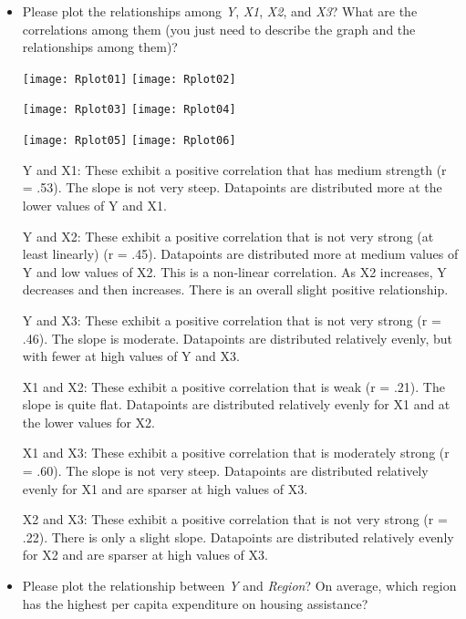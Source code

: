 \documentclass[12pt,letterpaper]{article}
\begin{document}
\begin{itemize}

\item
Please plot the relationships among \emph{Y}, \emph{X1}, \emph{X2}, and \emph{X3}? What are the correlations among them (you just need to describe the graph and the relationships among them)?
\vspace{.5cm}

\graphicspath{ {./Images/} }

\texttt{[image: Rplot01]}
\texttt{[image: Rplot02]}

\texttt{[image: Rplot03]}
\texttt{[image: Rplot04]}

\texttt{[image: Rplot05]}
\texttt{[image: Rplot06]}

  


Y and X1: These exhibit a positive correlation that has medium strength (r = .53). The slope is not very steep. Datapoints are distributed more at the lower values of Y and X1. 


Y and X2: These exhibit a positive correlation that is not very strong (at least linearly) (r = .45). Datapoints are distributed more at medium values of Y and low values of X2. This is a non-linear correlation. As X2 increases, Y decreases and then increases. There is an overall slight positive relationship. 


Y and X3: These exhibit a positive correlation that is not very strong (r = .46). The slope is moderate. Datapoints are distributed relatively evenly, but with fewer at high values of Y and X3.


X1 and X2: These exhibit a positive correlation that is weak (r = .21). The slope is quite flat. Datapoints are distributed relatively evenly for X1 and at the lower values for X2.


X1 and X3: These exhibit a positive correlation that is moderately strong (r = .60). The slope is not very steep. Datapoints are distributed relatively evenly for X1 and are sparser at high values of X3. 


X2 and X3: These exhibit a positive correlation that is not very strong (r = .22). There is only a slight slope. Datapoints are distributed relatively evenly for X2 and are sparser at high values of X3. \\


\item
Please plot the relationship between \emph{Y} and \emph{Region}? On average, which region has the highest per capita expenditure on housing assistance?
\vspace{.5cm}


\end{itemize}
\end{document}
